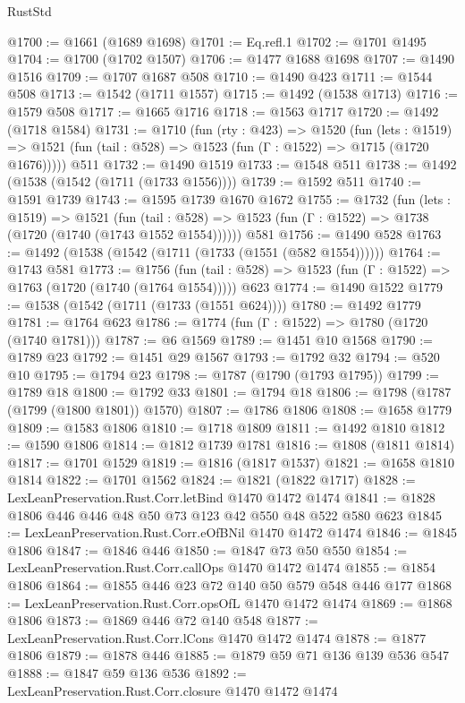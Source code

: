 \begin{lexlean}{RustStd}
\begin{coremodule}
@1700 := @1661 (@1689 @1698)
@1701 := Eq.refl.{1}
@1702 := @1701 @1495
@1704 := @1700 (@1702 @1507)
@1706 := @1477 @1688 @1698
@1707 := @1490 @1516
@1709 := @1707 @1687 @508
@1710 := @1490 @423
@1711 := @1544 @508
@1713 := @1542 (@1711 @1557)
@1715 := @1492 (@1538 @1713)
@1716 := @1579 @508
@1717 := @1665 @1716
@1718 := @1563 @1717
@1720 := @1492 (@1718 @1584)
@1731 := @1710
    (fun (rty : @423) =>
    @1520
      (fun (lets : @1519) =>
      @1521 (fun (tail : @528) => @1523 (fun (Γ : @1522) => @1715 (@1720 @1676)))))
    @511
@1732 := @1490 @1519
@1733 := @1548 @511
@1738 := @1492 (@1538 (@1542 (@1711 (@1733 @1556))))
@1739 := @1592 @511
@1740 := @1591 @1739
@1743 := @1595 @1739 @1670 @1672
@1755 := @1732
    (fun (lets : @1519) =>
    @1521
      (fun (tail : @528) => @1523 (fun (Γ : @1522) => @1738 (@1720 (@1740 (@1743 @1552 @1554))))))
    @581
@1756 := @1490 @528
@1763 := @1492 (@1538 (@1542 (@1711 (@1733 (@1551 (@582 @1554))))))
@1764 := @1743 @581
@1773 := @1756
    (fun (tail : @528) => @1523 (fun (Γ : @1522) => @1763 (@1720 (@1740 (@1764 @1554)))))
    @623
@1774 := @1490 @1522
@1779 := @1538 (@1542 (@1711 (@1733 (@1551 @624))))
@1780 := @1492 @1779
@1781 := @1764 @623
@1786 := @1774 (fun (Γ : @1522) => @1780 (@1720 (@1740 @1781)))
@1787 := @6 @1569
@1789 := @1451 @10 @1568
@1790 := @1789 @23
@1792 := @1451 @29 @1567
@1793 := @1792 @32
@1794 := @520 @10
@1795 := @1794 @23
@1798 := @1787 (@1790 (@1793 @1795))
@1799 := @1789 @18
@1800 := @1792 @33
@1801 := @1794 @18
@1806 := @1798 (@1787 (@1799 (@1800 @1801)) @1570)
@1807 := @1786 @1806
@1808 := @1658 @1779
@1809 := @1583 @1806
@1810 := @1718 @1809
@1811 := @1492 @1810
@1812 := @1590 @1806
@1814 := @1812 @1739 @1781
@1816 := @1808 (@1811 @1814)
@1817 := @1701 @1529
@1819 := @1816 (@1817 @1537)
@1821 := @1658 @1810 @1814
@1822 := @1701 @1562
@1824 := @1821 (@1822 @1717)
@1828 := LexLeanPreservation.Rust.Corr.letBind @1470 @1472 @1474
@1841 := @1828 @1806 @446 @446 @48 @50 @73 @123 @42 @550 @48 @522 @580 @623
@1845 := LexLeanPreservation.Rust.Corr.eOfBNil @1470 @1472 @1474
@1846 := @1845 @1806
@1847 := @1846 @446
@1850 := @1847 @73 @50 @550
@1854 := LexLeanPreservation.Rust.Corr.callOps @1470 @1472 @1474
@1855 := @1854 @1806
@1864 := @1855 @446 @23 @72 @140 @50 @579 @548 @446 @177
@1868 := LexLeanPreservation.Rust.Corr.opsOfL @1470 @1472 @1474
@1869 := @1868 @1806
@1873 := @1869 @446 @72 @140 @548
@1877 := LexLeanPreservation.Rust.Corr.lCons @1470 @1472 @1474
@1878 := @1877 @1806
@1879 := @1878 @446
@1885 := @1879 @59 @71 @136 @139 @536 @547
@1888 := @1847 @59 @136 @536
@1892 := LexLeanPreservation.Rust.Corr.closure @1470 @1472 @1474

\end{coremodule}
\end{lexlean}
